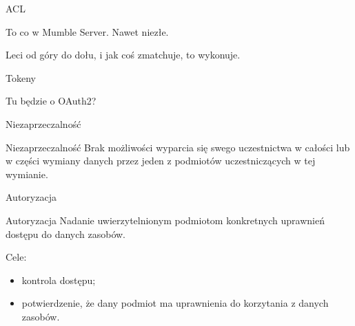 \begin{frame}{ACL}
	
	To co w Mumble Server. Nawet niezłe.
	
	Leci od góry do dołu, i jak coś zmatchuje, to wykonuje.
	
\end{frame}

\begin{frame}{Tokeny}
	
	Tu będzie o OAuth2?
	
\end{frame}

\begin{frame}{Niezaprzeczalność}
	
	\begin{alertblock}{Niezaprzeczalność}
		Brak możliwości wyparcia się swego uczestnictwa w całości lub w części wymiany danych przez jeden z podmiotów uczestniczących w tej wymianie.
	\end{alertblock}
	
\end{frame}

\begin{frame}{Autoryzacja}
	
	\begin{alertblock}{Autoryzacja}
		Nadanie uwierzytelnionym podmiotom konkretnych uprawnień dostępu do danych zasobów.
	\end{alertblock}
	
	Cele:
	\begin{itemize}
		\item kontrola dostępu;
		\item potwierdzenie, że dany podmiot ma uprawnienia do korzytania z danych zasobów.
	\end{itemize}
	
\end{frame}
